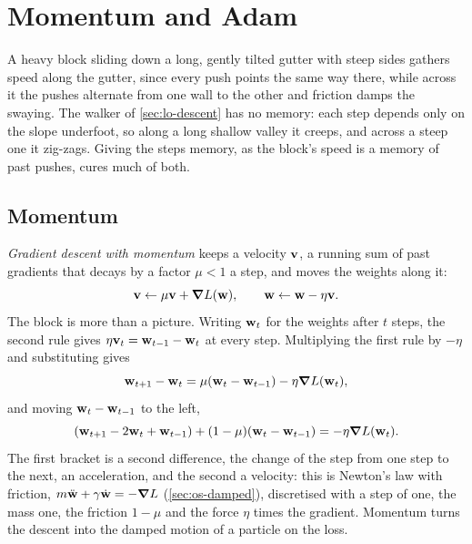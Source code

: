 \section{Momentum and Adam}
\label{sec:lo-momentum}

A heavy block sliding down a long, gently tilted gutter with steep sides
gathers speed along the gutter, since every push points the same way
there, while across it the pushes alternate from one wall to the other
and friction damps the swaying. The walker of \cref{sec:lo-descent} has
no memory: each step depends only on the slope underfoot, so along a
long shallow valley it creeps, and across a steep one it zig-zags. Giving
the steps memory, as the block's speed is a memory of past pushes, cures
much of both.

\subsection*{Momentum}

\emph{Gradient descent with momentum} keeps a velocity $\bm{\mathrm{v}}$, a
running sum of past gradients that decays by a factor $\mu < 1$ a step,
and moves the weights along it:
\begin{equation}
   \bm{\mathrm{v}} \leftarrow \mu\bm{\mathrm{v}} + \bm{\nabla} L(\bm{\mathrm{w}}) , \qquad
   \bm{\mathrm{w}} \leftarrow \bm{\mathrm{w}} - \eta\bm{\mathrm{v}} .
   \label{eq:lo-momentum}
\end{equation}
The block is more than a picture. Writing $\bm{\mathrm{w}}_t$ for the weights after
$t$ steps, the second rule gives $\eta\bm{\mathrm{v}}_t = \bm{\mathrm{w}}_{t-1} - \bm{\mathrm{w}}_t$
at every step. Multiplying the first rule by $-\eta$ and substituting
gives
\begin{equation*}
   \bm{\mathrm{w}}_{t+1} - \bm{\mathrm{w}}_t = \mu(\bm{\mathrm{w}}_t - \bm{\mathrm{w}}_{t-1})
   - \eta\bm{\nabla} L(\bm{\mathrm{w}}_t) ,
\end{equation*}
and moving $\bm{\mathrm{w}}_t - \bm{\mathrm{w}}_{t-1}$ to the left,
\begin{equation*}
   (\bm{\mathrm{w}}_{t+1} - 2\bm{\mathrm{w}}_t + \bm{\mathrm{w}}_{t-1})
   + (1 - \mu)(\bm{\mathrm{w}}_t - \bm{\mathrm{w}}_{t-1}) = -\eta\bm{\nabla} L(\bm{\mathrm{w}}_t) .
\end{equation*}
The first bracket is a second difference, the change of the step from
one step to the next, an acceleration, and the second a velocity: this is
Newton's law with friction, $m\ddot{\bm{\mathrm{w}}} + \gamma\dot{\bm{\mathrm{w}}} =
-\bm{\nabla} L$ (\cref{sec:os-damped}), discretised with a step of one, the
mass one, the friction $1 - \mu$ and the force $\eta$ times the gradient.
Momentum turns the descent into the damped motion of a particle on the
loss.

